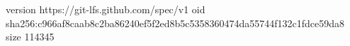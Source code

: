 version https://git-lfs.github.com/spec/v1
oid sha256:c966af8caab8c2ba86240ef5f2ed8b5c5358360474da55744f132c1fdce59da8
size 114345
